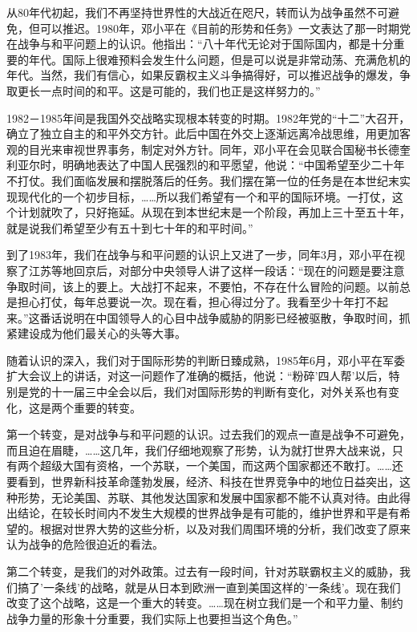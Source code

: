 \documentclass[UTF8, 12pt, a4paper]{ctexrep}
\begin{document}
从80年代初起，我们不再坚持世界性的大战近在咫尺，转而认为战争虽然不可避免，但可以推迟。1980年，邓小平在《目前的形势和任务》一文表达了那一时期党在战争与和平问题上的认识。他指出：“八十年代无论对于国际国内，都是十分重要的年代。国际上很难预料会发生什么问题，但是可以说是非常动荡、充满危机的年代。当然，我们有信心，如果反霸权主义斗争搞得好，可以推迟战争的爆发，争取更长一点时间的和平。这是可能的，我们也正是这样努力的。”

1982－1985年间是我国外交战略实现根本转变的时期。1982年党的“十二”大召开，确立了独立自主的和平外交方针。此后中国在外交上逐渐远离冷战思维，用更加客观的目光来审视世界事务，制定对外方针。同年，邓小平在会见联合国秘书长德奎利亚尔时，明确地表达了中国人民强烈的和平愿望，他说：“中国希望至少二十年不打仗。我们面临发展和摆脱落后的任务。我们摆在第一位的任务是在本世纪末实现现代化的一个初步目标，……所以我们希望有一个和平的国际环境。一打仗，这个计划就吹了，只好拖延。从现在到本世纪末是一个阶段，再加上三十至五十年，就是说我们希望至少有五十到七十年的和平时间。”

到了1983年，我们在战争与和平问题的认识上又进了一步，同年3月，邓小平在视察了江苏等地回京后，对部分中央领导人讲了这样一段话：“现在的问题是要注意争取时间，该上的要上。大战打不起来，不要怕，不存在什么冒险的问题。以前总是担心打仗，每年总要说一次。现在看，担心得过分了。我看至少十年打不起来。”这番话说明在中国领导人的心目中战争威胁的阴影已经被驱散，争取时间，抓紧建设成为他们最关心的头等大事。

随着认识的深入，我们对于国际形势的判断日臻成熟，1985年6月，邓小平在军委扩大会议上的讲话，对这一问题作了准确的概括，他说：“粉碎'四人帮'以后，特别是党的十一届三中全会以后，我们对国际形势的判断有变化，对外关系也有变化，这是两个重要的转变。

第一个转变，是对战争与和平问题的认识。过去我们的观点一直是战争不可避免，而且迫在眉睫，……这几年，我们仔细地观察了形势，认为就打世界大战来说，只有两个超级大国有资格，一个苏联，一个美国，而这两个国家都还不敢打。……还要看到，世界新科技革命蓬勃发展，经济、科技在世界竞争中的地位日益突出，这种形势，无论美国、苏联、其他发达国家和发展中国家都不能不认真对待。由此得出结论，在较长时间内不发生大规模的世界战争是有可能的，维护世界和平是有希望的。根据对世界大势的这些分析，以及对我们周围环境的分析，我们改变了原来认为战争的危险很迫近的看法。

第二个转变，是我们的对外政策。过去有一段时间，针对苏联霸权主义的威胁，我们搞了'一条线'的战略，就是从日本到欧洲一直到美国这样的'一条线'。现在我们改变了这个战略，这是一个重大的转变。……现在树立我们是一个和平力量、制约战争力量的形象十分重要，我们实际上也要担当这个角色。”
\end{document}
